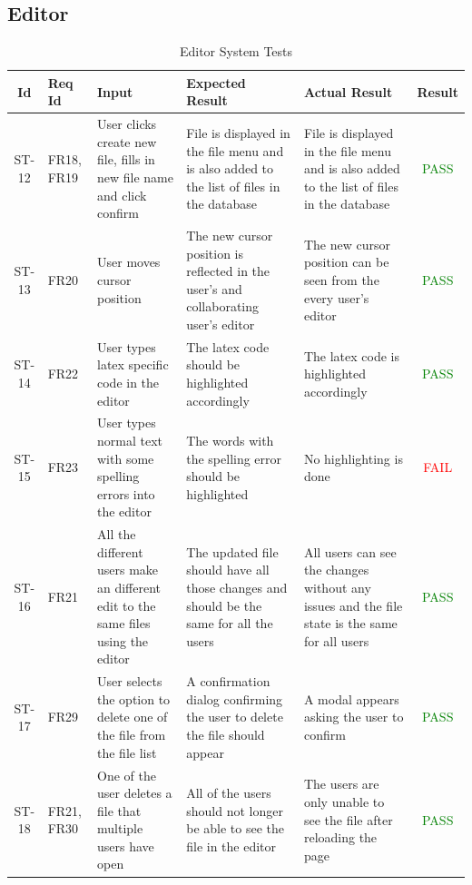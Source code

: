 \documentclass[12pt, titlepage]{article}
\begin{document}
\subsection{Editor}

\begin{center}
    \begin{longtable}{|c|p{1cm}|p{2.7cm}|p{3cm}|p{3cm}|c|}
        \caption{Editor System Tests \label{long}}\\
        \hline
        \textbf{Id} & \textbf{Req Id} & \textbf{Input} & \textbf{Expected Result} & \textbf{Actual Result} & \textbf{Result}\\
        \hline
        ST-12 & FR18, FR19 & User clicks create new file, fills in new file name and click confirm & File is displayed in the file menu and is also added to the list of files in the database &  File is displayed in the file menu and is also added to the list of files in the database &  \textcolor{green}{PASS} \\
        \hline
        ST-13 & FR20 & User moves cursor position & The new cursor position is reflected in the user's and collaborating user's editor & The new cursor position can be seen from the every user's editor &  \textcolor{green}{PASS} \\
        \hline
        ST-14 & FR22 & User types latex specific code in the editor & The latex code should be highlighted accordingly & The latex code is highlighted accordingly &  \textcolor{green}{PASS}  \\
        \hline
        ST-15 & FR23 & User types normal text with some spelling errors into the editor & The words with the spelling error should be highlighted & No highlighting is done  &  \textcolor{red}{FAIL} \\
        \hline
        ST-16 & FR21 & All the different users make an different edit to the same files using the editor & The updated file should have all those changes and should be the same for all the users & All users can see the changes without any issues and the file state is the same for all users  &  \textcolor{green}{PASS} \\
        \hline
        ST-17 & FR29 & User selects the option to delete one of the file from the file list & A confirmation dialog confirming the user to delete the file should
appear &  A modal appears asking the user to confirm &  \textcolor{green}{PASS} \\
        \hline
        ST-18 & FR21, FR30 & One of the user deletes a file that multiple users have open & All of the users should not longer be able to see the file in the editor & The users are only unable to see the file after reloading the page & \textcolor{green}{PASS} \\

\end{longtable}
\end{center}
\end{document}
